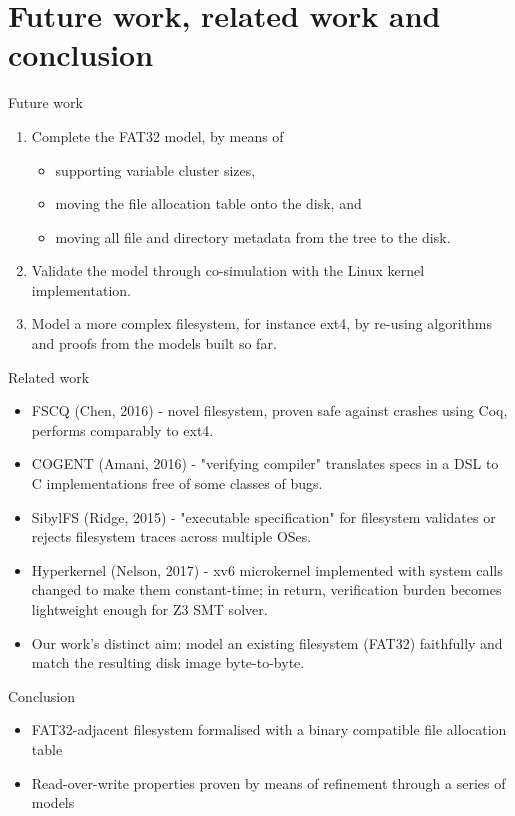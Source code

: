 \documentclass{beamer}
\begin{document}
\section{Future work, related work and conclusion}

\begin{frame}{Future work}
  \begin{enumerate}
  \item Complete the FAT32 model, by means of
    \begin{itemize}
    \item supporting variable cluster sizes,
    \item moving the file allocation table onto the disk, and
    \item moving all file and directory metadata from the tree to the
      disk.
    \end{itemize}
  \item Validate the model through co-simulation with the Linux kernel
    implementation.
  \item Model a more complex filesystem, for instance ext4, by
    re-using algorithms and proofs from the models built so far.
  \end{enumerate}
\end{frame}

\begin{frame}{Related work}
  \begin{itemize}
  \item FSCQ (Chen, 2016) - novel filesystem, proven
    safe against crashes using Coq, performs comparably to
    ext4.
  \item COGENT (Amani, 2016) - "verifying compiler" translates specs
    in a DSL to C implementations free of some classes of bugs.
  \item SibylFS (Ridge, 2015) - "executable specification" for
    filesystem validates or rejects filesystem traces across multiple
    OSes.
  \item Hyperkernel (Nelson, 2017) - xv6 microkernel implemented
    with system calls changed to make them constant-time; in return,
    verification burden becomes lightweight enough for Z3 SMT solver.
  \item Our work's distinct aim: model an existing filesystem (FAT32)
    faithfully and match the resulting disk image byte-to-byte.
  \end{itemize}
\end{frame}

\begin{frame}{Conclusion}
  \begin{itemize}
  \item FAT32-adjacent filesystem formalised with
    a binary compatible file allocation table
  \item Read-over-write properties proven by means of refinement
    through a series of models
  \end{itemize}
\end{frame}
\end{document}
